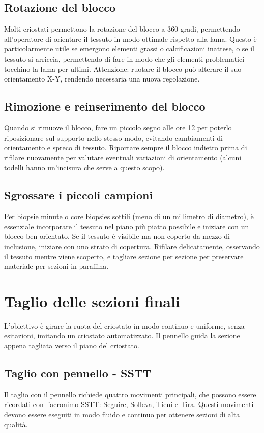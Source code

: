 \subsection{Rotazione del blocco}
Molti criostati permettono la rotazione del blocco a 360 gradi, permettendo all'operatore di orientare il tessuto in modo ottimale rispetto alla lama. Questo è particolarmente utile se emergono elementi grassi o calcificazioni inattese, o se il tessuto si arriccia, permettendo di fare in modo che gli elementi problematici tocchino la lama per ultimi. Attenzione: ruotare il blocco può alterare il suo orientamento X-Y, rendendo necessaria una nuova regolazione.

\subsection{Rimozione e reinserimento del blocco}
Quando si rimuove il blocco, fare un piccolo segno alle ore 12 per poterlo riposizionare sul supporto nello stesso modo, evitando cambiamenti di orientamento e spreco di tessuto. Riportare sempre il blocco indietro prima di rifilare nuovamente per valutare eventuali variazioni di orientamento (alcuni todelli hanno un'incisura che serve a questo scopo).

\subsection{Sgrossare i piccoli campioni}
Per biopsie minute o core biopsies sottili (meno di un millimetro di diametro), è essenziale incorporare il tessuto nel piano più piatto possibile e iniziare con un blocco ben orientato. Se il tessuto è visibile ma non coperto da mezzo di inclusione, iniziare con uno strato di copertura. Rifilare delicatamente, osservando il tessuto mentre viene scoperto, e tagliare sezione per sezione per preservare materiale per sezioni in paraffina. 

\section{Taglio delle sezioni finali}
L'obiettivo è girare la ruota del criostato in modo continuo e uniforme, senza esitazioni, imitando un criostato automatizzato. Il pennello guida la sezione appena tagliata verso il piano del criostato.

\subsection{Taglio con pennello - SSTT}
Il taglio con il pennello richiede quattro movimenti principali, che possono essere ricordati con l'acronimo SSTT: Seguire, Solleva, Tieni e Tira. Questi movimenti devono essere eseguiti in modo fluido e continuo per ottenere sezioni di alta qualità.

